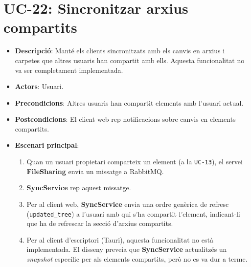 \section{UC-22: Sincronitzar arxius compartits}
\begin{itemize}
    \item \textbf{Descripció}: Manté els clients sincronitzats amb els canvis en arxius i carpetes que altres usuaris han compartit amb ells. Aquesta funcionalitat no va ser completament implementada.
    \item \textbf{Actors}: Usuari.
    \item \textbf{Precondicions}: Altres usuaris han compartit elements amb l'usuari actual.
    \item \textbf{Postcondicions}: El client web rep notificacions sobre canvis en elements compartits.
    \item \textbf{Escenari principal}:
    \begin{enumerate}
        \item Quan un usuari propietari comparteix un element (a la \texttt{UC-13}), el servei \textbf{FileSharing} envia un missatge a RabbitMQ.
        \item \textbf{SyncService} rep aquest missatge.
        \item Per al client web, \textbf{SyncService} envia una ordre genèrica de refresc (\texttt{updated\_tree}) a l'usuari amb qui s'ha compartit l'element, indicant-li que ha de refrescar la secció d'arxius compartits.
        \item Per al client d'escriptori (Tauri), aquesta funcionalitat no està implementada. El disseny preveia que \textbf{SyncService} actualitzés un \textit{snapshot} específic per als elements compartits, però no es va dur a terme.
    \end{enumerate}
\end{itemize}

